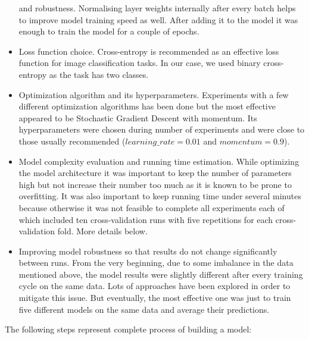 \documentclass[a4paper]{article}
\begin{document}
\begin{itemize}
        and robustness. Normalising layer weights internally after every batch helps to improve model training
        speed as well. After adding it to the model it was enough to train the model for a couple of epochs.
        \item Loss function choice. Cross-entropy is recommended as an effective loss function for image classification
        tasks. In our case, we used binary cross-entropy as the task has two classes.
        \item Optimization algorithm and its hyperparameters. Experiments with a few different optimization algorithms
        has been done but the most effective appeared to be Stochastic Gradient Descent with momentum.
        Its hyperparameters were chosen during number of experiments and were close to those usually recommended
        ($learning\_rate=0.01$ and $momentum=0.9$).
        \item Model complexity evaluation and running time estimation. While optimizing the model architecture it was
        important to keep the number of parameters high but not increase their number too much as it is known to be prone 
        to overfitting. It was also important to keep running time under several minutes because otherwise
        it was not feasible to complete all experiments each of which included ten cross-validation runs
        with five repetitions for each cross-validation fold. More details below.
        \item Improving model robustness so that results do not change significantly between runs. From the very beginning, 
        due to some imbalance in the data mentioned above, the model results were slightly different after
        every training cycle on the same data. Lots of approaches have been explored in order to mitigate this issue.
        But eventually, the most effective one was just to train five different models on the same data and average their predictions.
    \end{itemize}
    
    \pagebreak
    The following steps represent complete process of building a model:
    
\end{document}
